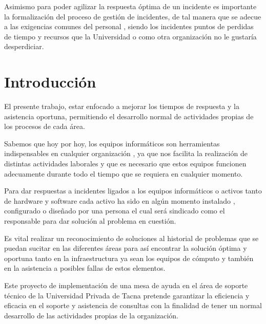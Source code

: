 \documentclass[preprint,12pt]{elsarticle}
\begin{document}
Asimismo para poder agilizar la respuesta óptima de un incidente es importante la formalización del proceso de gestión de incidentes, de tal manera que se adecue a las exigencias comunes del personal , siendo los incidentes puntos de perdidas de tiempo y recursos que la Universidad o como otra organización no le gustaría desperdiciar.





\section{Introducción} 

El presente trabajo, estar enfocado a mejorar los tiempos de respuesta y la asistencia oportuna, permitiendo el desarrollo normal de actividades propias de los procesos de cada área.

Sabemos que hoy por hoy,  los equipos informáticos son herramientas indispensables en cualquier organización , ya que nos facilita la realización de distintas actividades laborales y que es necesario que estos equipos funcionen adecuamente durante todo el tiempo que se requiera en cualquier momento.

Para dar respuestas a incidentes ligados a los equipos informáticos o activos tanto de hardware y software cada activo ha sido en algún momento instalado , configurado o diseñado por una persona el cual será sindicado como el responsable para dar solución al problema en cuestión.

Es vital realizar un reconocimiento de soluciones al historial de problemas que se puedan sucitar en las diferentes áreas  para así encontrar la solución óptima y oportuna tanto en la infraestructura ya sean los equipos de cómputo y también en la asistencia a posibles fallas de estos elementos.

Este proyecto de implementación de una mesa de ayuda en el área de soporte técnico de la Universidad Privada de Tacna pretende garantizar la eficiencia y eficacia en el soporte y asistencia de consultas con la finalidad de  tener un  normal desarrollo de las actividades propias de la organización.

\end{document}
